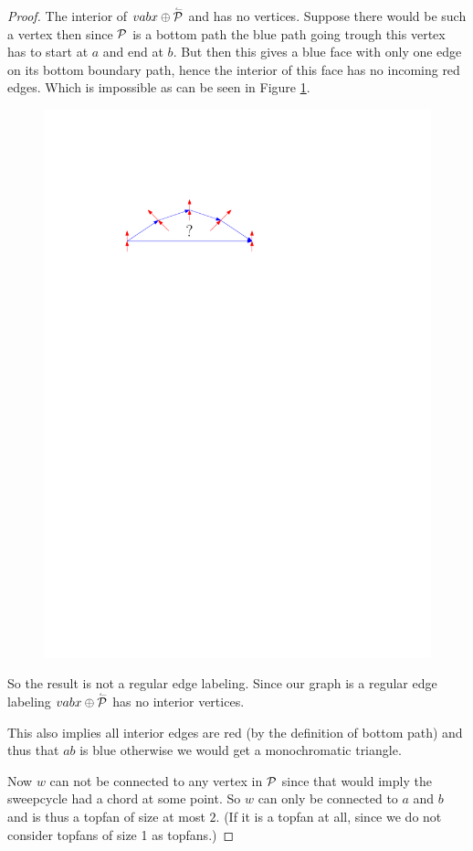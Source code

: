 \begin{proof}
      The interior of  $vabx \oplus \rev \P$ and has no vertices. Suppose there would be such a vertex then since $\P$ is a bottom path the blue path going trough this vertex has to start at $a$ and end at $b$. But then this gives a blue face with only one edge on its bottom boundary path, hence the interior of this face has no incoming red edges.
      Which is impossible as can be seen in Figure \ref{fig:sweep:noFaceWithOneBottomEdge}.

      \begin{figure}[h]
        \centering
        \includegraphics[scale=1]{unifiedAlgo/img/sweep/noFaceWithOneBottomEdge.pdf}
        \caption{}
        \label{fig:sweep:noFaceWithOneBottomEdge}
      \end{figure}

      So the result is not a regular edge labeling. Since our graph is a regular edge labeling $vabx \oplus \rev \P$ has no interior vertices.

      This also implies all interior edges are red (by the definition of bottom path) and thus that $ab$ is blue otherwise we would get a monochromatic triangle.

      Now $w$ can not be connected to any vertex in $\P$ since that would imply the sweepcycle had a chord at some point.
      So $w$ can only be connected to $a$ and $b$ and is thus a topfan of size at most $2$.
      (If it is a topfan at all, since we do not consider topfans of size 1 as topfans.)
    \end{proof}
